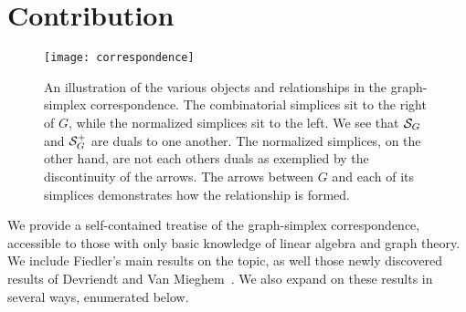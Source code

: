 \section{Contribution}
\label{chap:intro_contribution}

\begin{figure}
	\centering 
	\texttt{[image: correspondence]}
	\caption{An illustration of the various objects and relationships in the graph-simplex correspondence. The combinatorial simplices sit to the right of $G$, while the normalized simplices sit to the left. We see that  $\mathcal{S}_G$ and $\mathcal{S}_G^+$ are duals to one another. The normalized simplices,  on the other hand, are not each others duals as exemplied by the discontinuity of the arrows. The arrows between $G$ and each of its simplices demonstrates how the relationship is formed.  }
	\label{fig:correspondence}
\end{figure}

We provide a self-contained treatise of the graph-simplex correspondence, accessible  to those with only  basic knowledge of linear algebra and  graph theory. We include Fiedler's main results  on the topic, as well those newly discovered results of Devriendt and Van Mieghem~\cite{devriendt2018simplex}. We also expand on these results in several ways,  enumerated  below. 




